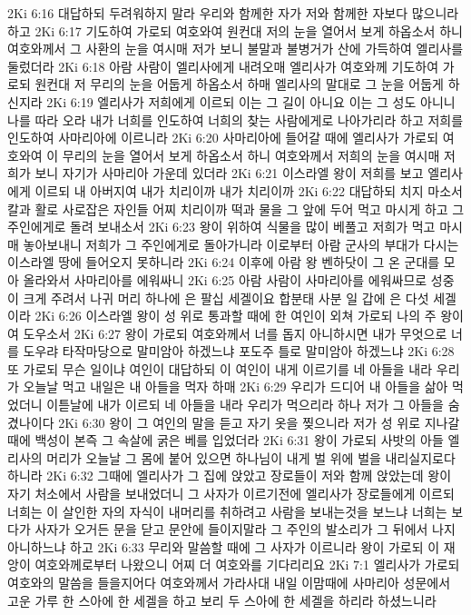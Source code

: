2Ki 6:16  대답하되 두려워하지 말라 우리와 함께한 자가 저와 함께한 자보다 많으니라 하고
2Ki 6:17  기도하여 가로되 여호와여 원컨대 저의 눈을 열어서 보게 하옵소서 하니 여호와께서 그 사환의 눈을 여시매 저가 보니 불말과 불병거가 산에 가득하여 엘리사를 둘렀더라
2Ki 6:18  아람 사람이 엘리사에게 내려오매 엘리사가 여호와께 기도하여 가로되 원컨대 저 무리의 눈을 어둡게 하옵소서 하매 엘리사의 말대로 그 눈을 어둡게 하신지라
2Ki 6:19  엘리사가 저희에게 이르되 이는 그 길이 아니요 이는 그 성도 아니니 나를 따라 오라 내가 너희를 인도하여 너희의 찾는 사람에게로 나아가리라 하고 저희를 인도하여 사마리아에 이르니라
2Ki 6:20  사마리아에 들어갈 때에 엘리사가 가로되 여호와여 이 무리의 눈을 열어서 보게 하옵소서 하니 여호와께서 저희의 눈을 여시매 저희가 보니 자기가 사마리아 가운데 있더라
2Ki 6:21  이스라엘 왕이 저희를 보고 엘리사에게 이르되 내 아버지여 내가 치리이까 내가 치리이까
2Ki 6:22  대답하되 치지 마소서 칼과 활로 사로잡은 자인들 어찌 치리이까 떡과 물을 그 앞에 두어 먹고 마시게 하고 그 주인에게로 돌려 보내소서
2Ki 6:23  왕이 위하여 식물을 많이 베풀고 저희가 먹고 마시매 놓아보내니 저희가 그 주인에게로 돌아가니라 이로부터 아람 군사의 부대가 다시는 이스라엘 땅에 들어오지 못하니라
2Ki 6:24  이후에 아람 왕 벤하닷이 그 온 군대를 모아 올라와서 사마리아를 에워싸니
2Ki 6:25  아람 사람이 사마리아를 에워싸므로 성중이 크게 주려서 나귀 머리 하나에 은 팔십 세겔이요 합분태 사분 일 갑에 은 다섯 세겔 이라
2Ki 6:26  이스라엘 왕이 성 위로 통과할 때에 한 여인이 외쳐 가로되 나의 주 왕이여 도우소서
2Ki 6:27  왕이 가로되 여호와께서 너를 돕지 아니하시면 내가 무엇으로 너를 도우랴 타작마당으로 말미암아 하겠느냐 포도주 틀로 말미암아 하겠느냐
2Ki 6:28  또 가로되 무슨 일이냐 여인이 대답하되 이 여인이 내게 이르기를 네 아들을 내라 우리가 오늘날 먹고 내일은 내 아들을 먹자 하매
2Ki 6:29  우리가 드디어 내 아들을 삶아 먹었더니 이튿날에 내가 이르되 네 아들을 내라 우리가 먹으리라 하나 저가 그 아들을 숨겼나이다
2Ki 6:30  왕이 그 여인의 말을 듣고 자기 옷을 찢으니라 저가 성 위로 지나갈 때에 백성이 본즉 그 속살에 굵은 베를 입었더라
2Ki 6:31  왕이 가로되 사밧의 아들 엘리사의 머리가 오늘날 그 몸에 붙어 있으면 하나님이 내게 벌 위에 벌을 내리실지로다 하니라
2Ki 6:32  그때에 엘리사가 그 집에 앉았고 장로들이 저와 함께 앉았는데 왕이 자기 처소에서 사람을 보내었더니 그 사자가 이르기전에 엘리사가 장로들에게 이르되 너희는 이 살인한 자의 자식이 내머리를 취하려고 사람을 보내는것을 보느냐 너희는 보다가 사자가 오거든 문을 닫고 문안에 들이지말라 그 주인의 발소리가 그 뒤에서 나지아니하느냐 하고
2Ki 6:33  무리와 말씀할 때에 그 사자가 이르니라 왕이 가로되 이 재앙이 여호와께로부터 나왔으니 어찌 더 여호와를 기다리리요
2Ki 7:1  엘리사가 가로되 여호와의 말씀을 들을지어다 여호와께서 가라사대 내일 이맘때에 사마리아 성문에서 고운 가루 한 스아에 한 세겔을 하고 보리 두 스아에 한 세겔을 하리라 하셨느니라
